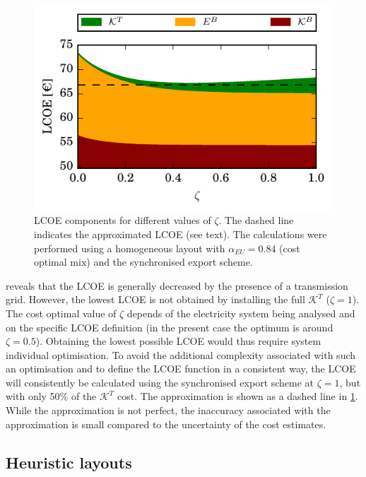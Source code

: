 \documentclass[a4paper, 5p, sort&compress]{elsarticle}%
\begin{document}
\begin{figure}[h!]
  \centering
  \includegraphics[width = \columnwidth]{constrainedSync-new}
  \caption{LCOE components for different values of $\zeta$. The dashed
    line indicates the approximated LCOE (see text). The calculations
    were performed using a homogeneous layout with
    $\alpha_{EU} = 0.84$ (cost optimal mix) and the synchronised export
    scheme.}
  \label{fig:transmission-lcoe}
\end{figure}

 reveals that the LCOE is generally
decreased by the presence of a transmission grid. However, the lowest
LCOE is not obtained by installing the full $\mathcal{K}^{T}$
($\zeta = 1$). The cost optimal value of $\zeta$ depends of the electricity
system being analysed and on the specific LCOE definition (in the
present case the optimum is around $\zeta= 0.5$). Obtaining the lowest
possible LCOE would thus require system individual optimisation. To
avoid the additional complexity associated with such an optimisation
and to define the LCOE function in a consistent way, the LCOE will
consistently be calculated using the synchronised export scheme at
$\zeta=1$, but with only 50\% of the $\mathcal{K}^{T}$ cost. The
approximation is shown as a dashed line in
\cref{fig:transmission-lcoe}. While the approximation is not perfect,
the inaccuracy associated with the approximation is small
compared to the uncertainty of the cost estimates.

\subsection{Heuristic layouts}
\label{sec:heuristic-layouts}
\end{document}
